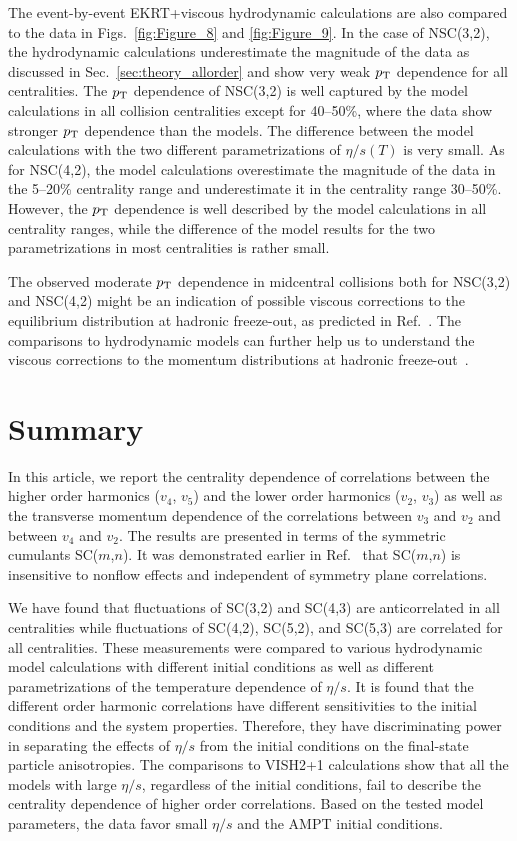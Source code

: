 The event-by-event EKRT+viscous hydrodynamic calculations are also compared to the data in Figs.~\ref{fig:Figure_8} and \ref{fig:Figure_9}.
In the case of NSC(3,2), the hydrodynamic calculations underestimate the magnitude of the data as discussed in Sec.~\ref{sec:theory_allorder} and show very weak $p_{\rm T}$ dependence for all centralities.
The $p_{\rm T}$ dependence of NSC(3,2) is well captured by the model calculations in all collision centralities except for 40--50\%, where the data show stronger $p_{\rm T}$ dependence than the models. The difference between the model calculations with the two different parametrizations of $\eta/s(T)$ is very small. 
As for NSC(4,2), the model calculations overestimate the magnitude of the data in the 5--20\% centrality range and underestimate it in the centrality range 30--50\%. However, the $p_{\rm T}$ dependence is well described by the model calculations in all centrality ranges, while the difference of the model results for the two parametrizations in most centralities is rather small.

The observed moderate $p_{\rm T}$ dependence in midcentral collisions both for NSC(3,2) and NSC(4,2) might be an indication of possible viscous corrections to the equilibrium distribution at hadronic freeze-out, as predicted in Ref.~\cite{Niemi:2012aj}.
The comparisons to hydrodynamic models can further help us to understand the viscous corrections to the momentum distributions at hadronic freeze-out~\cite{Dusling:2009df,Luzum:2010ad,Teaney:2012ke,Molnar:2014fva,Niemi:2015qia}.
 
\section{Summary}
\label{sec:summary}
In this article, we report the centrality dependence of correlations between the higher order harmonics ($v_4$, $v_5$) and the lower order harmonics ($v_2$, $v_3$) as well as the transverse momentum dependence of the correlations between $v_3$ and $v_2$ and between $v_4$ and $v_2$.
The results are presented in terms of the symmetric cumulants SC($m$,$n$). It was demonstrated earlier in Ref.~\cite{ALICE:2016kpq} that SC($m$,$n$) is insensitive to nonflow effects and independent of symmetry plane correlations.

We have found that fluctuations of SC(3,2) and SC(4,3) are anticorrelated in all centralities while fluctuations of SC(4,2), SC(5,2), and SC(5,3) are correlated for all centralities. 
These measurements were compared to various hydrodynamic model calculations with different initial conditions as well as different parametrizations of the temperature dependence of $\eta/s$.
It is found that the different order harmonic correlations have different sensitivities to the initial conditions and the system properties. Therefore, they have discriminating power in separating the effects of $\eta/s$  from the initial conditions on the final-state particle anisotropies.
The comparisons to VISH2+1 calculations show that all the models with large $\eta/s$, regardless of the initial conditions, fail to describe the centrality dependence of higher order correlations. 
Based on the tested model parameters, the data favor small $\eta/s$ and the AMPT initial conditions. 

